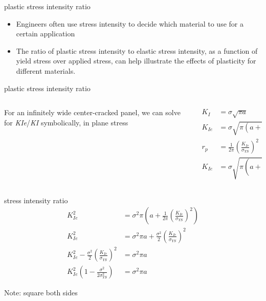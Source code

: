 \documentclass[
  letterpaper,
  ignorenonframetext,
  aspectratio=43,
  handout,
  12pt]{beamer}
\providecommand{\tightlist}{%
  \setlength{\itemsep}{0pt}\setlength{\parskip}{0pt}}
\providecommand{\tightlist}{%
\setlength{\itemsep}{0pt}\setlength{\parskip}{0pt}}
\begin{document}
\begin{frame}{plastic stress intensity ratio}
\protect\hypertarget{plastic-stress-intensity-ratio-1}{}
\begin{itemize}
\tightlist
\item
  Engineers often use stress intensity to decide which material to use
  for a certain application
\item
  The ratio of plastic stress intensity to elastic stress intensity, as
  a function of yield stress over applied stress, can help illustrate
  the effects of plasticity for different materials.
\end{itemize}
\end{frame}

\begin{frame}{plastic stress intensity ratio}
\protect\hypertarget{plastic-stress-intensity-ratio-2}{}
\begin{columns}[T]
\begin{column}{0.5\textwidth}
For an infinitely wide center-cracked panel, we can solve for
\emph{K}\emph{Ie}/\emph{K}\emph{I} symbolically, in plane stress
\end{column}

\begin{column}{0.5\textwidth}
\[\begin{aligned}
  K_I &= \sigma \sqrt{\pi a}\\
  K_{Ie} &= \sigma \sqrt{\pi(a+r_p)}\\
  r_p &= \frac{1}{2\pi} \left( \frac{K_{Ie}}{\sigma_{YS}}\right)^2\\
  K_{Ie} &= \sigma \sqrt{\pi \left(a+\frac{1}{2\pi} \left( \frac{K_{Ie}}{\sigma_{YS}}\right)^2\right)}
\end{aligned}\]
\end{column}
\end{columns}
\end{frame}

\begin{frame}{stress intensity ratio}
\protect\hypertarget{stress-intensity-ratio}{}
\[\begin{aligned}
  K_{Ie}^2 &= \sigma^2 \pi \left(a+\frac{1}{2\pi} \left( \frac{K_{Ie}}{\sigma_{YS}}\right)^2\right)\\
  K_{Ie}^2 &= \sigma^2 \pi a+\frac{\sigma^2}{2} \left( \frac{K_{Ie}}{\sigma_{YS}}\right)^2\\
  K_{Ie}^2 - \frac{\sigma^2}{2} \left( \frac{K_{Ie}}{\sigma_{YS}}\right)^2 &= \sigma^2 \pi a\\
  K_{Ie}^2\left(1 - \frac{\sigma^2}{2 \sigma_{YS}^2}\right) &= \sigma^2 \pi a
\end{aligned}\]

Note: square both sides
\end{frame}
\end{document}
